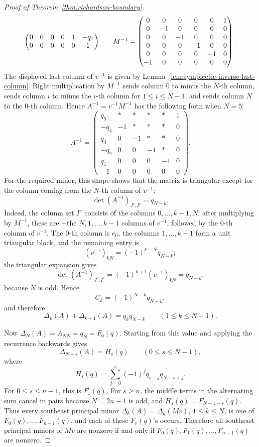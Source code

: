 \begin{proof}[Proof of Theorem~\ref{thm:richardson-boundary}]
\[\begin{array}{c@{\qquad}c}
\begin{pmatrix}
0&0&0&0&1&-q_1\\
0&0&0&0&0&1
\end{pmatrix}
&
M^{-1}=
\begin{pmatrix}
0&0&0&0&0&1\\
0&-1&0&0&0&0\\
0&0&-1&0&0&0\\
0&0&0&-1&0&0\\
0&0&0&0&-1&0\\
-1&0&0&0&0&0
\end{pmatrix}.
\end{array}
\]
The displayed last column of \(v^{-1}\) is given by Lemma~\ref{lem:symplectic-inverse-last-column}.
Right multiplication by \(M^{-1}\) sends column \(0\) to minus the \(N\)-th column, sends column \(i\) to minus the \(i\)-th column for \(1\le i\le N-1\), and sends column \(N\) to the \(0\)-th column. Hence \(A^{-1}=v^{-1}M^{-1}\) has the following form when \(N=5\):
\[
A^{-1}=
\begin{pmatrix}
q_5&*&*&*&*&1\\
-q_4&-1&*&*&*&0\\
q_3&0&-1&*&*&0\\
-q_2&0&0&-1&*&0\\
q_1&0&0&0&-1&0\\
-1&0&0&0&0&0
\end{pmatrix}.
\]
For the required minor, this shape shows that the matrix is triangular except for the column coming from the \(N\)-th column of \(v^{-1}\):
\[
\det(A^{-1})_{J^c,I^c}=q_{N-k}.
\]
Indeed, the column set \(I^c\) consists of the columns \(0,\ldots,k-1,N\); after multiplying by \(M^{-1}\), these are \(-\)the \(N,1,\ldots,k-1\) columns of \(v^{-1}\), followed by the \(0\)-th column of \(v^{-1}\). The \(0\)-th column is \(e_0\), the columns \(1,\ldots,k-1\) form a unit triangular block, and the remaining entry is
\[
(v^{-1})_{kN}=(-1)^{k-N}q_{N-k};
\]
the triangular expansion gives
\[
\det(A^{-1})_{J^c,I^c}
=(-1)^{k+1}(v^{-1})_{kN}
=q_{N-k},
\]
because \(N\) is odd. Hence
\[
C_k=(-1)^{N-k}q_{N-k},
\]
and therefore
\[
\Delta_k(A)+\Delta_{k+1}(A)=q_kq_{N-k}
\qquad(1\le k\le N-1).
\]

Now \(\Delta_N(A)=A_{NN}=q_N=F_0(q)\). Starting from this value and applying the recurrence backwards gives
\[
\Delta_{N-s}(A)=H_s(q)
\qquad(0\le s\le N-1),
\]
where
\[
H_s(q)=\sum_{j=0}^s(-1)^jq_{s-j}q_{N-s+j}.
\]
For \(0\le s\le n-1\), this is \(F_s(q)\). For \(s\ge n\), the middle terms in the alternating sum cancel in pairs because \(N=2n-1\) is odd, and \(H_s(q)=F_{N-1-s}(q)\). Thus every southeast principal minor \(\Delta_k(A)=\Delta_k(Mv)\), \(1\le k\le N\), is one of \(F_0(q),\ldots,F_{n-1}(q)\), and each of these \(F_r(q)\)'s occurs. Therefore all southeast principal minors of \(Mv\) are nonzero if and only if \(F_0(q),F_1(q),\ldots,F_{n-1}(q)\) are nonzero.


\end{proof}
